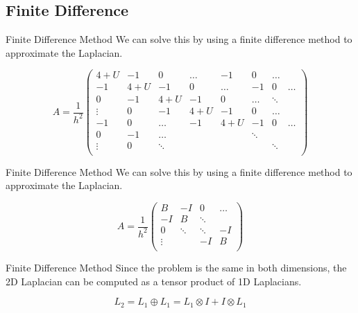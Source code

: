 \documentclass[mathserif]{beamer}
\begin{document}
\subsection{Finite Difference}

\begin{frame}{Finite Difference Method}
We can solve this by using a finite difference method to approximate the Laplacian. 

$$A = 
\frac{1}{h^2}
\begin{pmatrix}
4 + U & -1 & 0 & \hdots & -1 & 0 & \hdots \\
-1 & 4 + U & -1 & 0 & \hdots & -1 & 0 & \hdots \\
0 & -1 & 4 + U & -1 & 0 & \hdots  & \ddots \\
\vdots & 0 & -1 & 4 + U & -1 & 0 & \hdots  \\
-1 & 0 & \hdots & -1 & 4 + U & -1 & 0 & \hdots  \\
0 & -1 & \hdots &  &  & \ddots &  &  \\
\vdots & 0 & \ddots &  &  & & \ddots &  \\
\end{pmatrix}
$$
  
\end{frame}

\begin{frame}{Finite Difference Method}
We can solve this by using a finite difference method to approximate the Laplacian. 

$$A = 
\frac{1}{h^2}
\begin{pmatrix}
B & -I & 0 & \hdots \\
-I & B & \ddots  \\
0 & \ddots & \ddots & -I \\
\vdots &  & -I & B \\
\end{pmatrix}
$$

\end{frame}

\begin{frame}{Finite Difference Method}
Since the problem is the same in both dimensions, the 2D Laplacian can be computed as a tensor product of 1D Laplacians.

$$ L_2 = L_1 \oplus L_1 = L_1 \otimes I + I \otimes L_1 $$

\end{frame}
\end{document}
